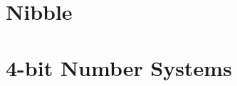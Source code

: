\documentclass[11pt]{article}
\begin{document}
\vfill

\clearpage

\begin{minipage}[t]{0.62\linewidth}
    \begin{minipage}[t]{0.48\linewidth}
        \section*{Nibble}
        
    \end{minipage}
    \hfill
    \begin{minipage}[t]{0.48\linewidth}
        \section*{4-bit Number Systems}
        
    \end{minipage}

    \vspace{1em}

    \begin{minipage}[t]{0.64\linewidth}
        
    \end{minipage}
    \hfill
    \begin{minipage}[t]{0.32\linewidth}
        
    \end{minipage}

    \begin{minipage}[t]{\linewidth}
        
    \end{minipage}

    \vspace{1em}

    \begin{minipage}[t]{\linewidth}
        
    \end{minipage}
\end{minipage}
\hfill
\begin{minipage}[t]{0.35\linewidth}
    
\end{minipage}
\end{document}
